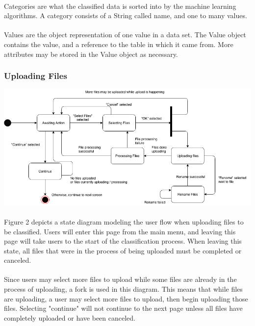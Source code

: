 \documentclass[12pt,oneside,letterpaper]{article}
\begin{document}
\paragraph{} Categories are what the classified data is sorted into by the machine learning algorithms. A category consists of a String called name, and one to many values.
\paragraph{} Values are the object representation of one value in a data set. The Value object contains the value, and a reference to the table in which it came from. More attributes may be stored in the Value object as necessary.

\subsubsection{Uploading Files}
\includegraphics[scale = 0.52]{spencer_state.png}
\begingroup
{}
\endgroup

\paragraph{} Figure 2 depicts a state diagram modeling the user flow when uploading files to be classified. Users will enter this page from the main menu, and leaving this page will take users to the start of the classification process. When leaving this state, all files that were in the process of being uploaded must be completed or canceled.
\paragraph{} Since users may select more files to upload while some files are already in the process of uploading, a fork is used in this diagram. This means that while files are uploading, a user may select more files to upload, then begin uploading those files. Selecting "continue" will not continue to the next page unless all files have completely uploaded or have been canceled.
\end{document}
